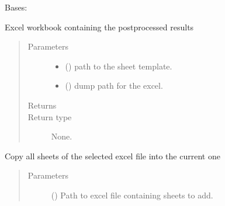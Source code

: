 \documentclass[letterpaper,10pt,english]{sphinxmanual}
\begin{document}
\begin{fulllineitems}
\label{\detokenize{api/postprocessing:output.ExcelOutputSheet}}
\sphinxAtStartPar
Bases: 

\sphinxAtStartPar
Excel workbook containing the post\sphinxhyphen{}processed results
\begin{quote}\begin{description}
\item[{Parameters}] \leavevmode\begin{itemize}
\item {} 
\sphinxAtStartPar
{} () \textendash{} path to the sheet template.

\item {} 
\sphinxAtStartPar
{} () \textendash{} dump path for the excel.

\end{itemize}

\item[{Returns}] \leavevmode
\sphinxAtStartPar


\item[{Return type}] \leavevmode
\sphinxAtStartPar
None.

\end{description}\end{quote}

\begin{fulllineitems}
\label{\detokenize{api/postprocessing:output.ExcelOutputSheet.copy_sheets}}
\sphinxAtStartPar
Copy all sheets of the selected excel file into the current one
\begin{quote}\begin{description}
\item[{Parameters}] \leavevmode
\sphinxAtStartPar
{} () \textendash{} Path to excel file containing sheets to add.


\end{description}
\end{quote}
\end{fulllineitems}
\end{fulllineitems}
\end{document}
